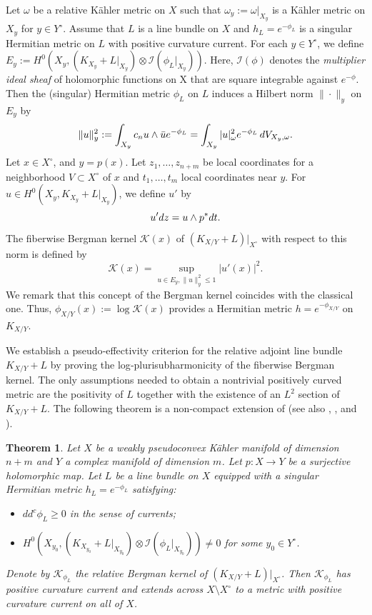 \documentclass[a4paper, 11pt]{amsart}
\theoremstyle{plain}
\newtheorem{theorem}{Theorem}[section]
\numberwithin{equation}{section} %
\numberwithin{figure}{section} %
\theoremstyle{plain}
\theoremstyle{plain}
\theoremstyle{plain}
\theoremstyle{plain}
\theoremstyle{remark}
\theoremstyle{definition}
\theoremstyle{definition}
\newcommand{\K}{\mathcal{K}}
\begin{document}
{Let $\omega$ be a relative K\"ahler metric on $X$ such that $\omega_y:=\omega|_{X_y}$ is a K\"ahler metric on $X_y$ for $y\in Y^\circ$. 
 Assume that $L$ is a line bundle on $X$ and $h_L=e^{-\phi_L}$ is a singular Hermitian metric on $L$ with positive curvature current. 
{For each $y\in Y^\circ$, we define  $E_y:=H^0(X_y,(K_{X_y}+ L|_{X_y})\otimes \mathcal{I}(\phi_L|_{X_y}))$}. Here, $\mathcal{I}(\phi)$ denotes the {\em multiplier ideal sheaf}  of holomorphic functions on X
that are square integrable against $e^{-\phi}$.
 Then the (singular) Hermitian metric $\phi_L$ on $L$ induces a Hilbert norm $\|\cdot\|_{y}$ on $E_y$ by
\begin{equation}
\|u\|^2_y:=\int_{X_y}c_nu\wedge \bar u e^{-\phi_L}=\int_{X_y}|u|_\omega^2e^{-\phi_L}\,{\rm d}V_{X_y,\omega}. 
\end{equation}
Let $x\in X^\circ$, and $y=p(x)$. Let $z_1, \ldots, z_{n+m}$ be local coordinates for a neighborhood $V\subset X^\circ$ of $x$ and $t_1, \ldots, t_m$ local coordinates near $y$. For $u\in H^0(X_y, K_{X_y}+L|_{X_y})$, we define $u'$  by $$u'{\rm d}z=u\wedge p^* {\rm d}t.$$
  The fiberwise Bergman kernel $\K(x)$ of $(K_{X/Y}+ L)|_{X^\circ}$ with respect to this norm is defined by 
\begin{equation}\label{eq_bergman_twist}
      \K(x)= \sup_{u\in E_y, \|u\|^2_y\leq 1  } |u'(x)|^2.
  \end{equation}
  We remark that this concept of the Bergman kernel coincides with the classical one.
Thus, $\phi_{X/Y}(x):= \log \K(x)$ provides a Hermitian metric $h=e^{-\phi_{X/Y}}$ on $K_{X/Y}$. 

We establish a pseudo‑effectivity criterion for the relative adjoint line bundle $K_{X/Y}+L$ by proving the log‑plurisubharmonicity of the fiberwise Bergman kernel. The only assumptions needed to obtain a nontrivial positively curved metric are the positivity of $L$ together with the existence of an $L^2$ section of $K_{X/Y}+L$. The following theorem is a non‑compact extension of \cite[Theorem~0.1]{Berndtsson_Paun_08} (see also \cite[Theorem 4.1.1]{Paun_Takayama_2018}, \cite[Theorem 1.3]{Zhou_Zhu_L_2_jdg}, \cite[Theorem 3.5]{cao17-OTtheorem} and \cite[Theorem 1.4]{Deng-Wang-Zhang-Zhou24-psh}).
\begin{theorem}\label{thm_variation}
   Let $X$ be a weakly pseudoconvex K\"ahler manifold of dimension $n+m$ and $Y$ a complex manifold of dimension $m$.
Let $p: X\to Y$ be a surjective holomorphic map.
    Let $L$ be a line bundle on $X$ equipped with a singular Hermitian metric $h_L = e^{-\phi_L}$ satisfying:
    \begin{itemize}
        \item  $dd^c \phi_L\geq 0$ in the sense of currents;
        \item  $H^0(X_{y_0}, (K_{X_{y_0}} + L|_{X_{y_0}})\otimes \mathcal{I}(\phi_L|_{X_{y_0}})) \neq 0$ for some $y_0 \in Y^\circ$. 
    \end{itemize} 
    Denote by $\K_{\phi_L}$ the relative Bergman kernel of $(K_{X/Y}+L)|_{X^\circ}$. Then $\K_{\phi_L}$ has positive curvature current and extends across $X\setminus X^\circ$ to a metric with positive curvature current on all of $X$.
\end{theorem}

}
\end{document}
